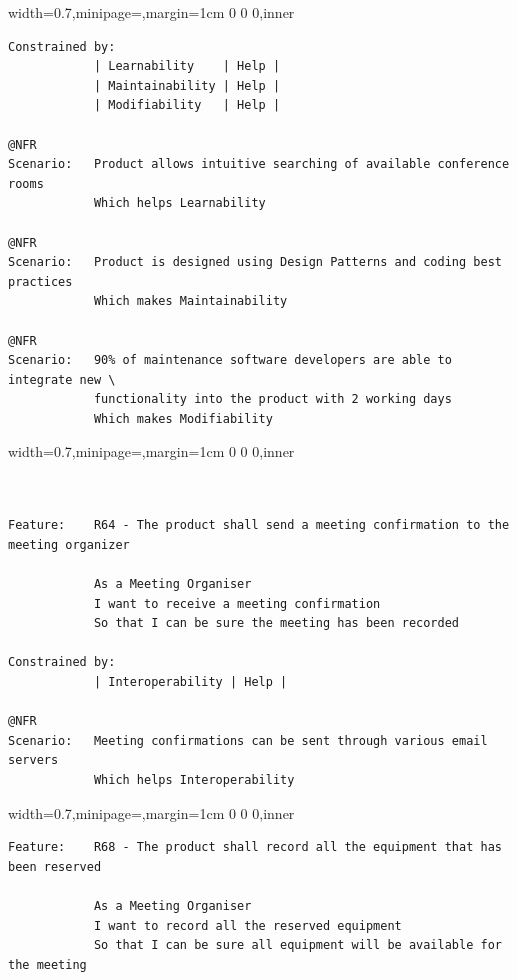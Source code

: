 \documentclass[dissertation,final]{softeng}
\newenvironment{featurecode}[1]
{ \lrbox\featurebox \begin{adjustbox}{width=#1\textwidth,minipage=\textwidth,margin=1cm 0 0 0,inner} }
{ \end{adjustbox}\endlrbox}
\newenvironment{featurelist}[2]
{
\newcommand{\setcaption}{\caption{#1}}
\newcommand{\setlabel}{\label{#2}}
}
{\begin{listing}[h!]\centering\usebox\featurebox\setcaption\setlabel\end{listing}}
\begin{document}
\begin{appendices}
\begin{featurelist}{R62 -- The product shall display a map of the company building}{lst:feature_r62}
\begin{featurecode}{0.7}
\begin{verbatim}
Constrained by:
            | Learnability    | Help |
            | Maintainability | Help |
            | Modifiability   | Help |

@NFR	
Scenario:   Product allows intuitive searching of available conference rooms
            Which helps Learnability
	
@NFR
Scenario:   Product is designed using Design Patterns and coding best practices
            Which makes Maintainability

@NFR
Scenario:   90% of maintenance software developers are able to integrate new \
            functionality into the product with 2 working days
            Which makes Modifiability
\end{verbatim}
\end{featurecode}
\end{featurelist}

\begin{featurelist}{R64 -- The product shall send a meeting confirmation to the meeting organizer}{lst:feature_r64}
\begin{featurecode}{0.7}
\begin{verbatim}


Feature:    R64 - The product shall send a meeting confirmation to the meeting organizer

            As a Meeting Organiser
            I want to receive a meeting confirmation
            So that I can be sure the meeting has been recorded
	
Constrained by:
            | Interoperability | Help |

@NFR	
Scenario:   Meeting confirmations can be sent through various email servers
            Which helps Interoperability
\end{verbatim}
\end{featurecode}
\end{featurelist}
\clearpage

\begin{featurelist}{R68 -- The product shall record all the equipment that has been reserved}{lst:feature_r68}
\begin{featurecode}{0.7}
\begin{verbatim}
Feature:    R68 - The product shall record all the equipment that has been reserved

            As a Meeting Organiser
            I want to record all the reserved equipment
            So that I can be sure all equipment will be available for the meeting
	

\end{verbatim}
\end{featurecode}
\end{featurelist}
\end{appendices}
\end{document}

